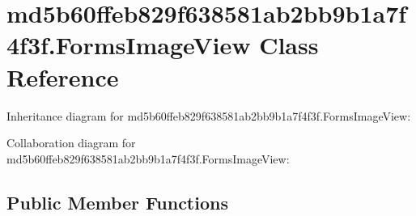 \hypertarget{classmd5b60ffeb829f638581ab2bb9b1a7f4f3f_1_1_forms_image_view}{}\section{md5b60ffeb829f638581ab2bb9b1a7f4f3f.\+Forms\+Image\+View Class Reference}
\label{classmd5b60ffeb829f638581ab2bb9b1a7f4f3f_1_1_forms_image_view}


Inheritance diagram for md5b60ffeb829f638581ab2bb9b1a7f4f3f.\+Forms\+Image\+View\+:


Collaboration diagram for md5b60ffeb829f638581ab2bb9b1a7f4f3f.\+Forms\+Image\+View\+:
\subsection*{Public Member Functions}
